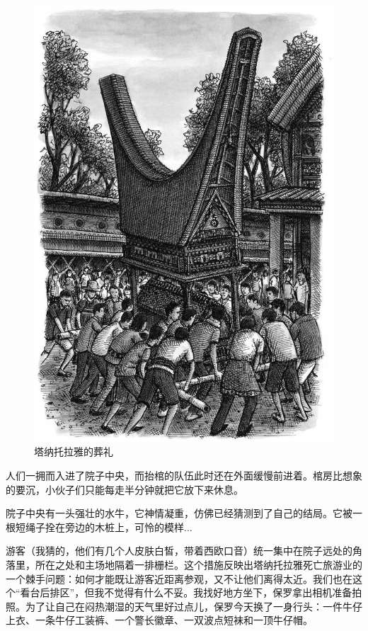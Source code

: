 \documentclass[12pt,oneside]{book}
\begin{document}
\begin{bookref}[frametitle={\cite{好好告别}}]
\begin{figure}[H]
\centering
\includegraphics[width=\linewidth ,totalheight=0.95\textheight , keepaspectratio]{塔纳托拉雅的葬礼.jpg}
\caption{塔纳托拉雅的葬礼}
\label{fig:ta_na_tuo_la_ya_de_zang_li}
\end{figure}

人们一拥而入进了院子中央，而抬棺的队伍此时还在外面缓慢前进着。棺房比想象的要沉，小伙子们只能每走半分钟就把它放下来休息。

院子中央有一头强壮的水牛，它神情凝重，仿佛已经猜测到了自己的结局。它被一根短绳子拴在旁边的木桩上，可怜的模样...

游客（我猜的，他们有几个人皮肤白皙，带着西欧口音）统一集中在院子远处的角落里，所在之处和主场地隔着一排栅栏。这个措施反映出塔纳托拉雅死亡旅游业的一个棘手问题：如何才能既让游客近距离参观，又不让他们离得太近。我们也在这个“看台后排区”，但我不觉得有什么不妥。我找好地方坐下，保罗拿出相机准备拍照。为了让自己在闷热潮湿的天气里好过点儿，保罗今天换了一身行头：一件牛仔上衣、一条牛仔工装裤、一个警长徽章、一双波点短袜和一顶牛仔帽。


\end{bookref}
\end{document}

